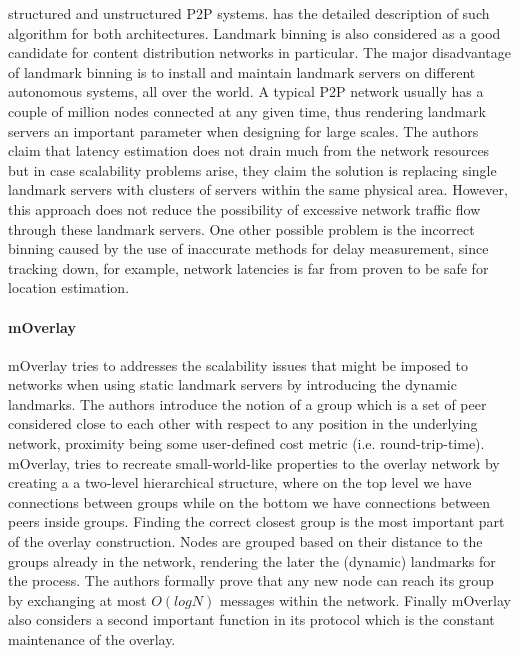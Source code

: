 structured and unstructured P2P systems. \cite{ratnasamy_binning_2002} has the
detailed description of such algorithm for both architectures. Landmark binning
is also considered as a good candidate for content distribution networks in
particular. The major disadvantage of landmark binning is to install and
maintain landmark servers on different autonomous systems, all over the world.
A typical P2P network usually has a couple of million nodes connected at any
given time, thus rendering landmark servers an important parameter when
designing for large scales.  The authors claim that latency estimation does not
drain much from the network resources but in case scalability problems arise,
they claim the solution is replacing single landmark servers with clusters of
servers within the same physical area. However, this approach does not reduce
the possibility of excessive network traffic flow through these landmark
servers. One other possible problem is the incorrect binning caused by the use
of inaccurate methods for delay measurement, since tracking down, for example,
network latencies is far from proven to be safe for location estimation.


\paragraph*{\bf mOverlay}
mOverlay \cite{zhang_moverlay_2004} tries to addresses the scalability
issues that might be imposed to networks when using static landmark servers by
introducing the dynamic landmarks. The authors introduce the notion of a group
which is a set of  peer considered close to each other with respect to any
position in the underlying network, proximity being some  user-defined cost
metric (i.e. round-trip-time). mOverlay, tries to recreate small-world-like
properties to the overlay network by creating a a two-level hierarchical
structure, where on the top level we have connections between groups while on
the bottom we have connections between peers inside groups. Finding the correct
closest group is the most important part  of the overlay construction. Nodes are
grouped based on their  distance to the groups already in the network, rendering
the  later the (dynamic) landmarks for the process. The authors formally prove
that any new node can reach its group by exchanging at most $O(logN)$ messages
within the network. Finally mOverlay also considers a second important function
in its protocol which is the constant maintenance of the overlay.

